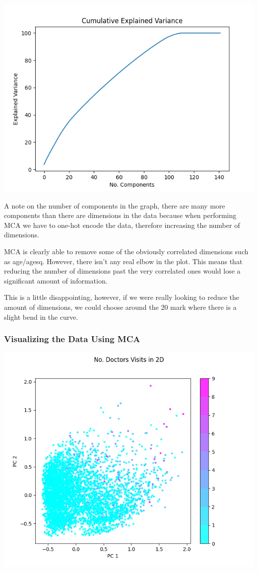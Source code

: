 \documentclass[
]{article}
\begin{document}
\includegraphics{mca_cumvar.png}

A note on the number of components in the graph, there are many more
components than there are dimensions in the data because when performing
MCA we have to one-hot encode the data, therefore increasing the number
of dimensions.

MCA is clearly able to remove some of the obviously correlated
dimensions such as age/agesq. However, there isn't any real elbow in the
plot. This means that reducing the number of dimensions past the very
correlated ones would lose a significant amount of information.

This is a little disappointing, however, if we were really looking to
reduce the amount of dimensions, we could choose around the 20 mark
where there is a slight bend in the curve.

\subsubsection{Visualizing the Data Using
MCA}\label{visualizing-the-data-using-mca}

\includegraphics{mca_doctors_2d.png}
\end{document}

